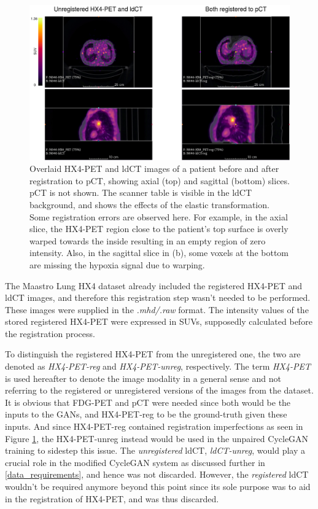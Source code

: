 \begin{figure}[h!]
    \centering
    \includegraphics[width=\linewidth]{figures/Data/reg/N046-HX4_PET_ldCT-unreg_reg.png}
    \caption{Overlaid HX4-PET and ldCT images of a patient before and after registration to pCT, showing axial (top) and sagittal (bottom) slices. pCT is not shown. The scanner table is visible in the ldCT background, and shows the effects of the elastic transformation. Some registration errors are observed here. For example, in the axial slice, the HX4-PET region close to the patient's top surface is overly warped towards the inside resulting in an empty region of zero intensity. Also, in the sagittal slice in (b), some voxels at the bottom are missing the hypoxia signal due to warping.}
    \label{fig:reg_images}
\end{figure}{}

The Maastro Lung HX4 dataset already included the registered HX4-PET and ldCT images, and therefore this registration step wasn't needed to be performed. These images were supplied in the \textit{.mhd/.raw} format. The intensity values of the stored registered HX4-PET were expressed in SUVs, supposedly calculated before the registration process. 

To distinguish the registered HX4-PET from the unregistered one, the two are denoted as \textit{HX4-PET-reg} and \textit{HX4-PET-unreg}, respectively. The term \textit{HX4-PET} is used hereafter to denote the image modality in a general sense and not referring to the registered or unregistered versions of the images from the dataset. It is obvious that FDG-PET and pCT were needed since both would be the inputs to the GANs, and HX4-PET-reg to be the ground-truth given these inputs. And since HX4-PET-reg contained registration imperfections as seen in Figure \ref{fig:reg_images}, the HX4-PET-unreg instead would be used in the unpaired CycleGAN training to sidestep this issue. The \textit{unregistered} ldCT, \textit{ldCT-unreg}, would play a crucial role in the modified CycleGAN system as discussed further in \ref{data_requirements}, and hence was not discarded. However, the \textit{registered} ldCT wouldn't be required anymore beyond this point since its sole purpose was to aid in the registration of HX4-PET, and was thus discarded.


